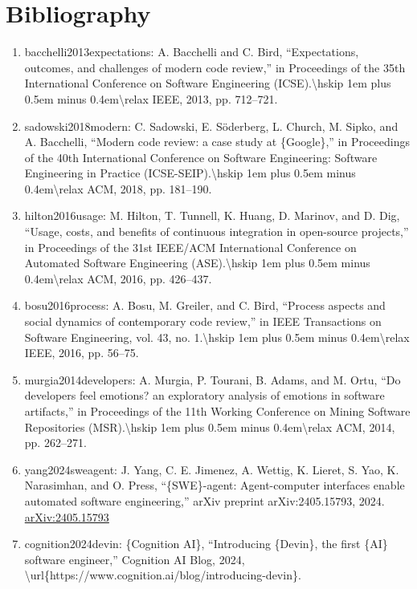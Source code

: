 \documentclass[11pt]{article}
\begin{document}
\section*{Bibliography}
\begin{enumerate}[leftmargin=*]
  \item bacchelli2013expectations: A. Bacchelli and C. Bird, ``Expectations, outcomes, and challenges of modern code review,'' in Proceedings of the 35th International Conference on Software Engineering (ICSE).\textbackslash{}hskip 1em plus 0.5em minus 0.4em\textbackslash{}relax IEEE, 2013, pp. 712--721.
  \item sadowski2018modern: C. Sadowski, E. Söderberg, L. Church, M. Sipko, and A. Bacchelli, ``Modern code review: a case study at \{Google\},'' in Proceedings of the 40th International Conference on Software Engineering: Software Engineering in Practice (ICSE-SEIP).\textbackslash{}hskip 1em plus 0.5em minus 0.4em\textbackslash{}relax ACM, 2018, pp. 181--190.
  \item hilton2016usage: M. Hilton, T. Tunnell, K. Huang, D. Marinov, and D. Dig, ``Usage, costs, and benefits of continuous integration in open-source projects,'' in Proceedings of the 31st IEEE/ACM International Conference on Automated Software Engineering (ASE).\textbackslash{}hskip 1em plus 0.5em minus 0.4em\textbackslash{}relax ACM, 2016, pp. 426--437.
  \item bosu2016process: A. Bosu, M. Greiler, and C. Bird, ``Process aspects and social dynamics of contemporary code review,'' in IEEE Transactions on Software Engineering, vol. 43, no. 1.\textbackslash{}hskip 1em plus 0.5em minus 0.4em\textbackslash{}relax IEEE, 2016, pp. 56--75.
  \item murgia2014developers: A. Murgia, P. Tourani, B. Adams, and M. Ortu, ``Do developers feel emotions? an exploratory analysis of emotions in software artifacts,'' in Proceedings of the 11th Working Conference on Mining Software Repositories (MSR).\textbackslash{}hskip 1em plus 0.5em minus 0.4em\textbackslash{}relax ACM, 2014, pp. 262--271.
  \item yang2024sweagent: J. Yang, C. E. Jimenez, A. Wettig, K. Lieret, S. Yao, K. Narasimhan, and O. Press, ``\{SWE\}-agent: Agent-computer interfaces enable automated software engineering,'' arXiv preprint arXiv:2405.15793, 2024. \href{https://arxiv.org/abs/2405.15793}{arXiv:2405.15793}
  \item cognition2024devin: \{Cognition AI\}, ``Introducing \{Devin\}, the first \{AI\} software engineer,'' Cognition AI Blog, 2024, \textbackslash{}url\{https://www.cognition.ai/blog/introducing-devin\}.

\end{enumerate}
\end{document}
